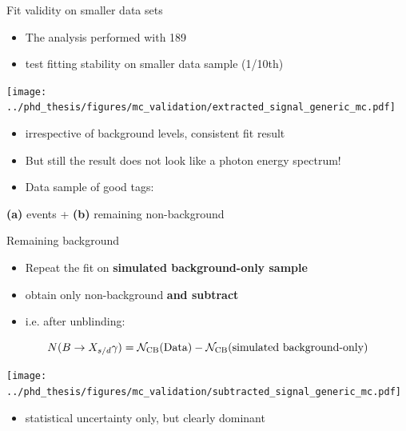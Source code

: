 \documentclass[xcolor=dvipsnames]{beamer}
\begin{document}
\begin{frame}{Fit validity on smaller data sets}
   \scriptsize\centering
   \begin{itemize}
      \item The analysis performed with 189~\invfb
      \item[\ra] test fitting stability on smaller data sample (1/10th)
   \end{itemize}

      \texttt{[image: ../phd\_thesis/figures/mc\_validation/extracted\_signal\_generic\_mc.pdf]}
  \begin{itemize}
   \item[\ra] irrespective of background levels, consistent fit result
   \item[\ra] But still the result does not look like a photon energy spectrum!   
  \end{itemize}

  \begin{itemize}
   \item Data sample of {\color{ForestGreen} good tags}:
\end{itemize}
    \textbf{(a)} \BtoXsgamma events + \textbf{(b)} remaining non-\BtoXsgamma background

\end{frame}

\begin{frame}{Remaining background}
\scriptsize\centering

       \vspace{10pt}
       \begin{itemize}
      \item Repeat the fit on \textbf{simulated background-only sample}
      \item[\ra] obtain only non-\BtoXsgamma background \textbf{and subtract}
      \item i.e. after unblinding:
   \end{itemize}
   \begin{equation*}
      N(\BtoXsdgamma) = \mathcal{N}_{\mathrm{CB}}(\text{Data}) - \mathcal{N}_{\mathrm{CB}}(\text{simulated background-only}) 
   \end{equation*}



   \texttt{[image: ../phd\_thesis/figures/mc\_validation/subtracted\_signal\_generic\_mc.pdf]}

\begin{itemize}
   \item[\ra] statistical uncertainty only, but clearly dominant 
\end{itemize}

\end{frame}
\end{document}
